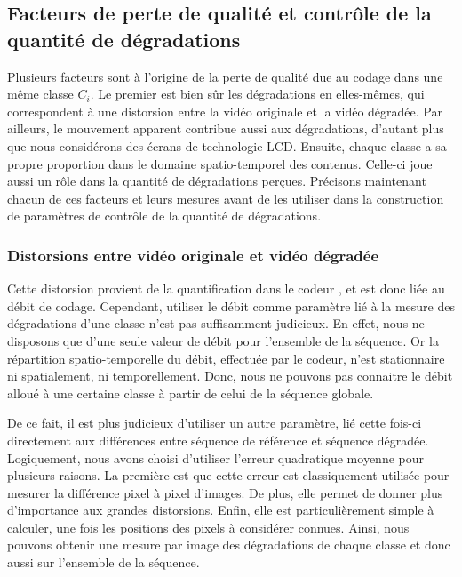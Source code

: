 \subsection{Facteurs de perte de qualité et contrôle de la quantité de dégradations}
Plusieurs facteurs sont à l'origine de la perte de qualité due au codage dans une même classe $C_i$. Le premier est bien sûr les dégradations en elles-mêmes, qui correspondent à une distorsion entre la vidéo originale et la vidéo dégradée. Par ailleurs, le mouvement apparent contribue aussi aux dégradations, d'autant plus que nous considérons des écrans de technologie LCD. Ensuite, chaque classe a sa propre proportion dans le domaine spatio-temporel des contenus. Celle-ci joue aussi un rôle dans la quantité de dégradations perçues. Précisons maintenant chacun de ces facteurs et leurs mesures avant de les utiliser dans la construction de paramètres de contrôle de la quantité de dégradations.


\subsubsection{Distorsions entre vidéo originale et vidéo dégradée}
Cette distorsion provient de la quantification dans le codeur \avc, et est donc liée au débit de codage. Cependant, utiliser le débit comme paramètre lié à la mesure des dégradations d'une classe n'est pas suffisamment judicieux. En effet, nous ne disposons que d'une seule valeur de débit pour l'ensemble de la séquence. Or la répartition spatio-temporelle du débit, effectuée par le codeur, n'est stationnaire ni spatialement, ni temporellement. Donc, nous ne pouvons pas connaitre le débit alloué à une certaine classe à partir de celui de la séquence globale.

De ce fait, il est plus judicieux d'utiliser un autre paramètre, lié cette fois-ci directement aux différences entre séquence de référence et séquence dégradée. Logiquement, nous avons choisi d'utiliser l'erreur quadratique moyenne pour plusieurs raisons. La première est que cette erreur est classiquement utilisée pour mesurer la différence pixel à pixel d'images. De plus, elle permet de donner plus d'importance aux grandes distorsions. Enfin, elle est particulièrement simple à calculer, une fois les positions des pixels à considérer connues. Ainsi, nous pouvons obtenir une mesure par image des dégradations de chaque classe et donc aussi sur l'ensemble de la séquence.


